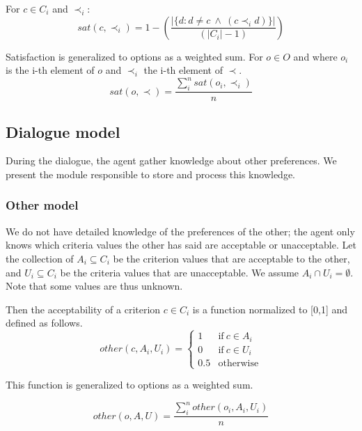 \documentclass{llncs}
\begin{document}
				For $c \in C_i$ and $\prec_i$:
				\begin{equation}
				sat(c, \prec_i) =	1 - \left( \frac{|\{d : d \neq c \  \wedge \ (c \prec_i d)\}| }{( |C_i| - 1 )}\right)
				\end{equation}

				
				Satisfaction is generalized to options as a weighted sum.
				For $o \in O$ and where $o_i$ is the i-th element of $o$ and $\prec_i$ the i-th element of $\prec$.
				\begin{equation}
					sat(o, \prec) = \frac{\sum_{i}^{n} sat(o_i, \prec_i) }{n}
				\end{equation}

				
				
				\subsection{Dialogue model}
				During the dialogue, the agent gather knowledge about other preferences. We present the module responsible to store and process this knowledge. 
				
				\subsubsection{Other model}
				We do not have detailed knowledge of the preferences of the other; the agent only knows which criteria values the other has said are acceptable or unacceptable.				
				Let the collection of $A_i \subseteq C_i$ be the criterion values that are acceptable to the other, and $U_i \subseteq C_i$ be the criteria values that are unacceptable.  We assume $A_i \cap U_i = \emptyset$.  Note	that some values are thus unknown.
				
				Then the acceptability of a criterion $c \in C_i$ is a function normalized to [0,1] and defined as follows.
				\begin{equation}
					other(c, A_i, U_i)= \left\{\begin{array}{ll}
					1	 & \mathrm{if\ }  c \in A_i\\
					0    & \mathrm{if\ }c \in U_i\\
					0.5	 & \mathrm{otherwise}
					\end{array}\right.
				\end{equation}
				
				
				This function is generalized to options as a weighted sum.
				
				\begin{equation}
					other(o, A, U) = \frac{ \sum_{i}^{n} other(o_i, A_i, U_i) } {n}
				\end{equation}
\end{document}
